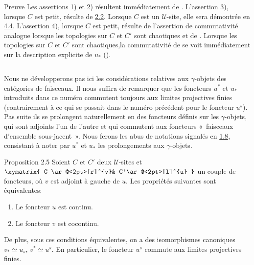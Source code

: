 \begin{enonce*}[remark]{Preuve}
Les assertions 1) et 2) résultent immédiatement de .
L'assertion 3), lorsque $C$ est petit, résulte de \hyperref[III.prop2.2]{2.2}.
Lorsque $C$ est un $𝒰$-site, elle sera démontrée en
\hyperref[III.subsec4.4]{4.4}. L'assertion 4), lorsque $C$ est petit, résulte
de l'assertion de commutativité analogue lorsque les topologies sur
$C$ et $C'$ sont chaotiques et de . Lorsque les
topologies sur $C$ et $C'$ sont chaotiques,\pageoriginale la
commutativité de  se voit immédiatement sur la
description explicite de $u_{\ast}$ ().
\end{enonce*}

\setcounter{subsection}{3}
\subsection{}
Nous ne développerons pas ici les considérations relatives aux
$\gamma$-objets des catégories de faisceaux. Il nous suffira de
remarquer que les foncteurs $u^{\ast}$ et $u_{\ast}$ introduits dans
ce numéro commutent toujours aux limites projectives finies
(contrairement à ce qui se passait dans le numéro précédent pour le
foncteur $u^s$). Pas suite ils se prolongent naturellement en des
foncteurs définis sur les $\gamma$-objets, qui sont adjoints l'un de
l'autre et qui commutent aux foncteurs « faisceaux d'ensemble
sous-jacent ». Nous ferons les abus de notations signalés en
\hyperref[III.not1.8]{1.8}, consistant à noter par $u^{\ast}$ et $u_{\ast}$
les prolongements aux $\gamma$-objets.

\begin{enonce*}{Proposition 2.5}
Soient $C$ et $C'$ deux $𝒰$-sites et $\xymatrix{ C
\ar@<2pt>[r]^{v}& C'\ar@<2pt>[l]^{u} }$ un couple de foncteurs, où
$v$ est adjoint à gauche de $u$. Les propriétés suivantes
sont équivalentes:
\begin{enumerate}
\renewcommand{\theenumi}{\roman{enumi}}
\renewcommand{\labelenumi}{\theenumi)}
\item Le foncteur $u$ est continu.

\item Le foncteur $v$ est cocontinu.
\end{enumerate}
De plus, sous ces conditions équivalentes, on a des
isomorphismes canoniques $v_{\ast}\simeq u_{s}$, $v^{\ast}\simeq
u^s$. En particulier, le foncteur $u^s$ commute aux limites
projectives finies.
\end{enonce*}

